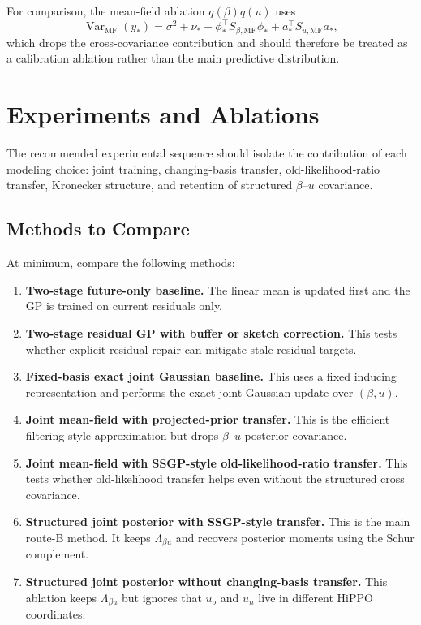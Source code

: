 \documentclass[12pt]{article}
\newcommand{\Var}{\operatorname{Var}}
\begin{document}
For comparison, the mean-field ablation $q(\beta)q(u)$ uses
\begin{equation}
    \Var_{\mathrm{MF}}(y_*)
    =
    \sigma^2+
    \nu_*+
    \phi_*^\top S_{\beta,\mathrm{MF}}\phi_*
    +
    a_*^\top S_{u,\mathrm{MF}}a_* ,
\end{equation}
which drops the cross-covariance contribution and should therefore be treated as a
calibration ablation rather than the main predictive distribution.


\section{Experiments and Ablations}
\label{sec:experiments_ablations}

The recommended experimental sequence should isolate the contribution of each modeling
choice: joint training, changing-basis transfer, old-likelihood-ratio transfer,
Kronecker structure, and retention of structured $\beta$--$u$ covariance.

\subsection{Methods to Compare}

At minimum, compare the following methods:
\begin{enumerate}[label=(\arabic*)]
    \item \textbf{Two-stage future-only baseline.}
    The linear mean is updated first and the GP is trained on current residuals only.

    \item \textbf{Two-stage residual GP with buffer or sketch correction.}
    This tests whether explicit residual repair can mitigate stale residual targets.

    \item \textbf{Fixed-basis exact joint Gaussian baseline.}
    This uses a fixed inducing representation and performs the exact joint Gaussian
    update over $(\beta,u)$.

    \item \textbf{Joint mean-field with projected-prior transfer.}
    This is the efficient filtering-style approximation but drops $\beta$--$u$ posterior
    covariance.

    \item \textbf{Joint mean-field with SSGP-style old-likelihood-ratio transfer.}
    This tests whether old-likelihood transfer helps even without the structured cross
    covariance.

    \item \textbf{Structured joint posterior with SSGP-style transfer.}
    This is the main route-B method. It keeps $\Lambda_{\beta u}$ and recovers posterior
    moments using the Schur complement.

    \item \textbf{Structured joint posterior without changing-basis transfer.}
    This ablation keeps $\Lambda_{\beta u}$ but ignores that $u_o$ and $u_n$ live in
    different HiPPO coordinates.
\end{enumerate}
\end{document}
